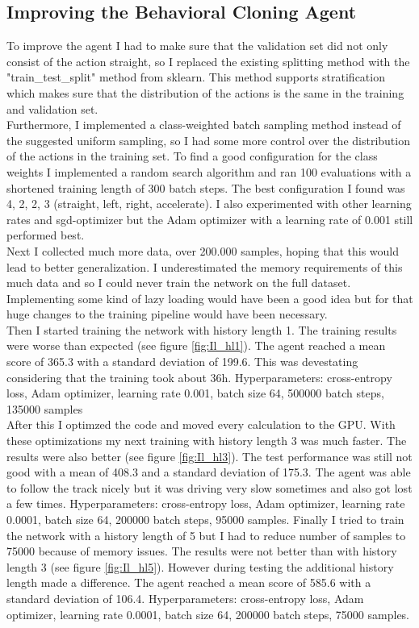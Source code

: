 \documentclass[10pt]{scrartcl}
\begin{document}
\subsection{Improving the Behavioral Cloning Agent}
To improve the agent I had to make sure that the validation set did not only consist of the action \dq straight\dq , so I replaced the existing splitting method with the "train\_test\_split" method from sklearn. This method supports stratification which makes sure that the distribution of the actions is the same in the training and validation set. \\
Furthermore, I implemented a class-weighted batch sampling method instead of the suggested uniform sampling, so I had some more control over the distribution of the actions in the training set. To find a good configuration for the class weights I implemented a random search algorithm and ran 100 evaluations with a shortened training length of 300 batch steps. The best configuration I found was 4, 2, 2, 3 (straight, left, right, accelerate). I also experimented with other learning rates and sgd-optimizer but the Adam optimizer with a learning rate of 0.001 still performed best. \\
Next I collected much more data, over 200.000 samples, hoping that this would lead to better generalization. I underestimated the memory requirements of this much data and so I could never train the network on the full dataset. Implementing some kind of lazy loading would have been a good idea but for that huge changes to the training pipeline would have been necessary. \\
Then I started training the network with history length 1. The training results were worse than expected (see figure \ref{fig:Il_hl1}). The agent reached a mean score of 365.3 with a standard deviation of 199.6. This was devestating considering that the training took about 36h.
Hyperparameters: cross-entropy loss, Adam optimizer, learning rate 0.001, batch size 64, 500000 batch steps, 135000 samples \\
After this I optimzed the code and moved every calculation to the GPU. With these optimizations my next training with history length 3 was much faster. The results were also better (see figure \ref{fig:Il_hl3}). The test performance was still not good with a mean of 408.3 and a standard deviation of 175.3. The agent was able to follow the track nicely but it was driving very slow sometimes and also got lost a few times. Hyperparameters: cross-entropy loss, Adam optimizer, learning rate 0.0001, batch size 64, 200000 batch steps, 95000 samples.
Finally I tried to train the network with a history length of 5 but I had to reduce number of samples to 75000 because of memory issues. The results were not better than with history length 3 (see figure \ref{fig:Il_hl5}). However during testing the additional history length made a difference. The agent reached a mean score of 585.6 with a standard deviation of 106.4. Hyperparameters: cross-entropy loss, Adam optimizer, learning rate 0.0001, batch size 64, 200000 batch steps, 75000 samples.
\end{document}
